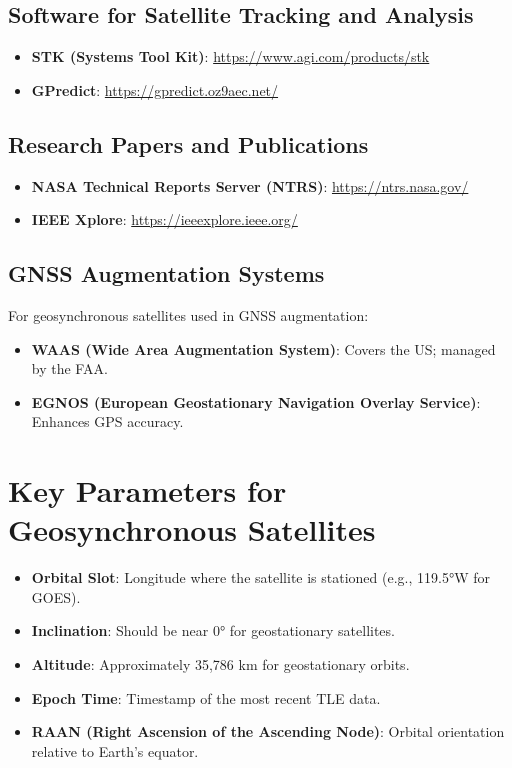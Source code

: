 \subsection{Software for Satellite Tracking and Analysis}
\begin{itemize}
    \item \textbf{STK (Systems Tool Kit)}: \url{https://www.agi.com/products/stk}
    \item \textbf{GPredict}: \url{https://gpredict.oz9aec.net/}
\end{itemize}

\subsection{Research Papers and Publications}
\begin{itemize}
    \item \textbf{NASA Technical Reports Server (NTRS)}: \url{https://ntrs.nasa.gov/}
    \item \textbf{IEEE Xplore}: \url{https://ieeexplore.ieee.org/}
\end{itemize}

\subsection{GNSS Augmentation Systems}
For geosynchronous satellites used in GNSS augmentation:
\begin{itemize}
    \item \textbf{WAAS (Wide Area Augmentation System)}: Covers the US; managed by the FAA.
    \item \textbf{EGNOS (European Geostationary Navigation Overlay Service)}: Enhances GPS accuracy.
\end{itemize}

\section{Key Parameters for Geosynchronous Satellites}
\begin{itemize}
    \item \textbf{Orbital Slot}: Longitude where the satellite is stationed (e.g., 119.5°W for GOES).
    \item \textbf{Inclination}: Should be near 0° for geostationary satellites.
    \item \textbf{Altitude}: Approximately 35,786 km for geostationary orbits.
    \item \textbf{Epoch Time}: Timestamp of the most recent TLE data.
    \item \textbf{RAAN (Right Ascension of the Ascending Node)}: Orbital orientation relative to Earth's equator.
\end{itemize}

\endinput  %
